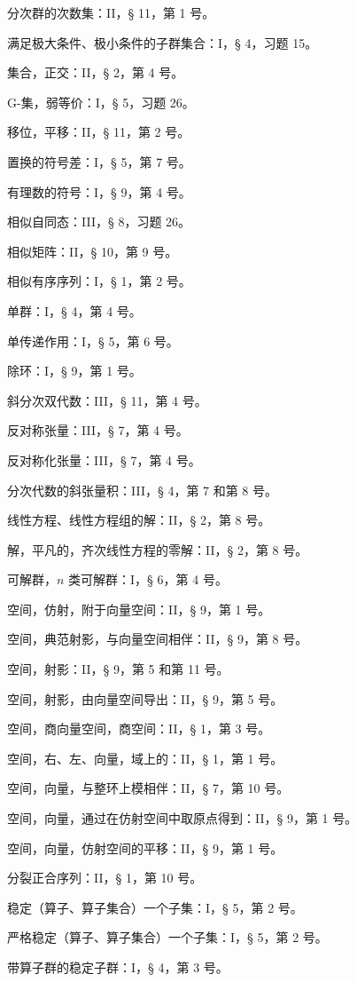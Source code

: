 分次群的次数集：II，§ 11，第 1 号。

满足极大条件、极小条件的子群集合：I，§ 4，习题 15。

集合，正交：II，§ 2，第 4 号。

G-集，弱等价：I，§ 5，习题 26。

移位，平移：II，§ 11，第 2 号。

置换的符号差：I，§ 5，第 7 号。

有理数的符号：I，§ 9，第 4 号。

相似自同态：III，§ 8，习题 26。

相似矩阵：II，§ 10，第 9 号。

相似有序序列：I，§ 1，第 2 号。

单群：I，§ 4，第 4 号。

单传递作用：I，§ 5，第 6 号。

除环：I，§ 9，第 1 号。

斜分次双代数：III，§ 11，第 4 号。

反对称张量：III，§ 7，第 4 号。

反对称化张量：III，§ 7，第 4 号。

分次代数的斜张量积：III，§ 4，第 7 和第 8 号。

线性方程、线性方程组的解：II，§ 2，第 8 号。

解，平凡的，齐次线性方程的零解：II，§ 2，第 8 号。

可解群，\(n\) 类可解群：I，§ 6，第 4 号。

空间，仿射，附于向量空间：II，§ 9，第 1 号。

空间，典范射影，与向量空间相伴：II，§ 9，第 8 号。

空间，射影：II，§ 9，第 5 和第 11 号。

空间，射影，由向量空间导出：II，§ 9，第 5 号。

空间，商向量空间，商空间：II，§ 1，第 3 号。

空间，右、左、向量，域上的：II，§ 1，第 1 号。

空间，向量，与整环上模相伴：II，§ 7，第 10 号。

空间，向量，通过在仿射空间中取原点得到：II，§ 9，第 1 号。

空间，向量，仿射空间的平移：II，§ 9，第 1 号。

分裂正合序列：II，§ 1，第 10 号。

稳定（算子、算子集合）一个子集：I，§ 5，第 2 号。

严格稳定（算子、算子集合）一个子集：I，§ 5，第 2 号。

带算子群的稳定子群：I，§ 4，第 3 号。

